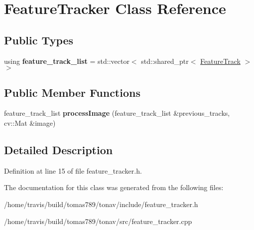 \hypertarget{class_feature_tracker}{\section{Feature\-Tracker Class Reference}
\label{class_feature_tracker}
}
\subsection*{Public Types}
\begin{DoxyCompactItemize}
\item 
\hypertarget{class_feature_tracker_a8c26ba2ee4c3653c6082a6ceec345f8a}{using {\bfseries feature\-\_\-track\-\_\-list} = std\-::vector$<$ std\-::shared\-\_\-ptr$<$ \hyperlink{class_feature_track}{Feature\-Track} $>$$>$}\label{class_feature_tracker_a8c26ba2ee4c3653c6082a6ceec345f8a}

\end{DoxyCompactItemize}
\subsection*{Public Member Functions}
\begin{DoxyCompactItemize}
\item 
\hypertarget{class_feature_tracker_a1d44cc6cd06ced4f321d2ecebfd7b069}{feature\-\_\-track\-\_\-list {\bfseries process\-Image} (feature\-\_\-track\-\_\-list \&previous\-\_\-tracks, cv\-::\-Mat \&image)}\label{class_feature_tracker_a1d44cc6cd06ced4f321d2ecebfd7b069}

\end{DoxyCompactItemize}


\subsection{Detailed Description}


Definition at line 15 of file feature\-\_\-tracker.\-h.



The documentation for this class was generated from the following files\-:\begin{DoxyCompactItemize}
\item 
/home/travis/build/tomas789/tonav/include/feature\-\_\-tracker.\-h\item 
/home/travis/build/tomas789/tonav/src/feature\-\_\-tracker.\-cpp\end{DoxyCompactItemize}
